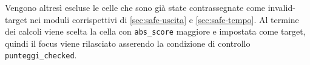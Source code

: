 Vengono altresì escluse le celle che sono già state contrassegnate come invalid-target nei moduli corrispettivi di \ref{sec:safe-uscita} e \ref{sec:safe-tempo}.
Al termine dei calcoli viene scelta la cella con \texttt{abs\_score} maggiore e impostata come target, quindi il focus viene rilasciato asserendo la condizione di controllo \texttt{punteggi\_checked}.
